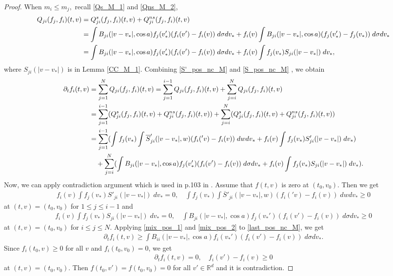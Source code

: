 \documentclass[reqno,10pt]{amsart}
\numberwithin{equation}{section}
\begin{document}
\begin{proof}
\noindent When $m_i \leq m_j,$ recall \eqref{Qs_M_1} and \eqref{Qns_M_2}, 
\begin{align}
    Q_{ji}(f_j,f_i)(t,v) &= Q^{s}_{ji}(f_j,f_i)(t,v) + Q^{ns}_{ji}(f_j,f_i)(t,v) \notag \\
    &=  \int B_{ji}(|v-v_*|,\cos a)f_j(v_*')(f_i(v')-f_i(v))\;d\sigma dv_* +  f_i(v)\int B_{ji}(|v-v_*|,\cos a)(f_j(v_*')-f_j(v_*)) \; d\sigma dv_* \notag \\ 
    &=  \int B_{ji}(|v-v_*|,\cos a)f_j(v_*')(f_i(v')-f_i(v))\;d\sigma dv_* +  f_i(v)\int f_j(v_*)S_{ji}(|v-v_*|)  \;dv_* \label{S_pos_nc_M},
\end{align} where $S_{ji}(|v-v_*|)$ is in Lemma \ref{CC_M_1}.\vspace{3mm}
\noindent Combining \eqref{S'_pos_nc_M} and \eqref{S_pos_nc_M} , we obtain
\begin{align}
    \partial_t f_i (t,v) &= \sum_{j=1}^{N} Q_{ji}(f_j,f_i) (t,v) 
    =\sum_{j=1}^{i-1}Q_{ji}(f_j,f_i) (t,v) + \sum_{j=i}^{N} Q_{ji}(f_j,f_i) (t,v) \notag \\ 
    &=\sum_{j=1}^{i-1}(Q^{s}_{ji}(f_j,f_i) (t,v)+Q^{ns}_{ji}(f_j,f_i) (t,v)) + \sum_{j=i}^{N} (Q^{s}_{ji}(f_j,f_i) (t,v)+Q^{ns}_{ji}(f_j,f_i) (t,v)) \notag \\ 
    &=\sum_{j=1}^{i-1}(\int f_j(v_*) \int \overline{S}'_{ji}(|v-v_*|,w)(f_i('v)-f_i(v)) \;dwdv_* 
+ f_i(v)\int f_j(v_*)S'_{ji}(|v-v_*|)  \;dv_*) \notag \\ 
&\quad + \sum_{j=i}^{N}(\int B_{ji}(|v-v_*|,\cos a)f_j(v_*')(f_i(v')-f_i(v))\;d\sigma dv_* + f_i(v)\int f_j(v_*)S_{ji}(|v-v_*|)  \;dv_*). \label{last_pos_nc_M}
\end{align}
\noindent 
Now, we can apply contradiction argument which is used in p.103 in \cite{V2002}. Assume that $f(t,v)$ is zero at $(t_0,v_0)$. Then we get
\begin{align} \label{mix_pos_1}
    f_i(v)\int f_j(v_*)S'_{ji}(|v-v_*|)  \;dv_* = 0, \quad \int f_j(v_*) \int \overline{S}'_{ji}(|v-v_*|,w)(f_i('v)-f_i(v)) \;dwdv_*  \geq 0
\end{align}   
at $(t,v)=(t_0,v_0)$ for $1 \leq j \leq i-1$ and 
\begin{align} \label{mix_pos_2}
    f_i(v)\int f_j(v_*)S_{ji}(|v-v_*|)  \;dv_* = 0, \quad \int B_{ji}(|v-v_*|,\cos a)f_j(v_*')(f_i(v')-f_i(v))\;d\sigma dv_* \geq 0
\end{align}
at $(t,v)=(t_0,v_0)$ for $i \leq j \leq N$. 
Applying \eqref{mix_pos_1} and \eqref{mix_pos_2} to  \eqref{last_pos_nc_M}, we get 
\begin{align*}
\partial_t f_{i}(t,v) \geq
    \int B_{ii}(|v-v_*|,\cos a)f_i(v_*')(f_i(v')-f_i(v))\;d\sigma dv_*.
\end{align*}  
Since $f_i(t_0,v) \geq 0$ for all $v$ and $f_i(t_0,v_0)=0$, we get
\begin{align*}
    \partial_t f_{i}(t,v)=0, \quad f_i(v')-f_i(v) \geq 0
\end{align*}
at $(t,v)=(t_0,v_0).$ Then $f(t_0,v')=f(t_0,v_0)=0$ for all $v' \in \mathbb{R}^d$ and it is contradiction. 
\end{proof} \vspace{3mm}
\end{document}
